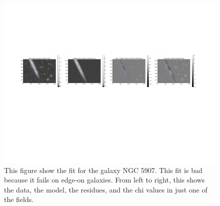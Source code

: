 \documentclass[12pt,preprint,pdftex]{aastex}
\begin{document}
\begin{figure}
\centering
\includegraphics[trim = .9cm 4.5cm 1.15cm 2.9cm,clip=true,width=\textwidth] {edgeon.pdf}
\caption{This figure show the fit for the galaxy NGC 5907. This fit is bad because it fails on edge-on galaxies. From left to right, this shows the data, the model, the residues, and the chi values in just one of the fields.}
\label{fig:edgeon}
\end{figure}
\end{document}
